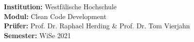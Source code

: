 \begin{titlepage}
    \maketitle
    \vspace{2cm}
    
    \vspace*{\fill}
    \begin{flushleft}
        \Large{\textbf{Institution:} Westf\"alische Hochschule}\\
        \Large{\textbf{Modul:} Clean Code Development} \\
        \Large{\textbf{Prüfer:} Prof. Dr. Raphael Herding \& Prof. Dr. Tom Vierjahn}\\
        \Large{\textbf{Semester:} WiSe 2021}
    \end{flushleft}
\end{titlepage}

